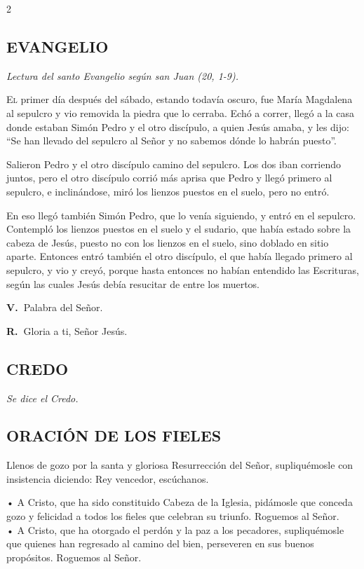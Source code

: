 \documentclass[11pt, letterpaper, twoside]{article}
\newcommand{\rubrica}[1]{\textcolor{rubricred}{\small\textit{#1}}}
\newcommand{\vers}{\textcolor{rubricred}{\textbf{V.\ }}}
\newcommand{\resp}{\textcolor{rubricred}{\textbf{R.\ }}}
\begin{document}
\begin{multicols}{2}
\subsection*{EVANGELIO}
\noindent\rubrica{Lectura del santo Evangelio según san Juan (20, 1-9).} \par\vspace{0.2cm}
\lettrine{E}{l} primer día después del sábado, estando todavía oscuro, fue María Magdalena al sepulcro y vio removida la piedra que lo cerraba. Echó a correr, llegó a la casa donde estaban Simón Pedro y el otro discípulo, a quien Jesús amaba, y les dijo: “Se han llevado del sepulcro al Señor y no sabemos dónde lo habrán puesto”.

Salieron Pedro y el otro discípulo camino del sepulcro. Los dos iban corriendo juntos, pero el otro discípulo corrió más aprisa que Pedro y llegó primero al sepulcro, e inclinándose, miró los lienzos puestos en el suelo, pero no entró.

En eso llegó también Simón Pedro, que lo venía siguiendo, y entró en el sepulcro. Contempló los lienzos puestos en el suelo y el sudario, que había estado sobre la cabeza de Jesús, puesto no con los lienzos en el suelo, sino doblado en sitio aparte. Entonces entró también el otro discípulo, el que había llegado primero al sepulcro, y vio y creyó, porque hasta entonces no habían entendido las Escrituras, según las cuales Jesús debía resucitar de entre los muertos. \par\vspace{0.2cm}
\vers Palabra del Señor. \par
\resp Gloria a ti, Señor Jesús.

\subsection*{CREDO}
\noindent\rubrica{Se dice el Credo.} \par\vspace{0.3cm}

\subsection*{ORACIÓN DE LOS FIELES}
Llenos de gozo por la santa y gloriosa Resurrección del Señor, supliquémosle con insistencia diciendo: Rey vencedor, escúchanos.

• A Cristo, que ha sido constituido Cabeza de la Iglesia, pidámosle que conceda gozo y felicidad a todos los fieles que celebran su triunfo. Roguemos al Señor. \\ 
• A Cristo, que ha otorgado el perdón y la paz a los pecadores, supliquémosle que quienes han regresado al camino del bien, perseveren en sus buenos propósitos. Roguemos al Señor. \par\vspace{0.3cm}



\end{multicols}
\end{document}
